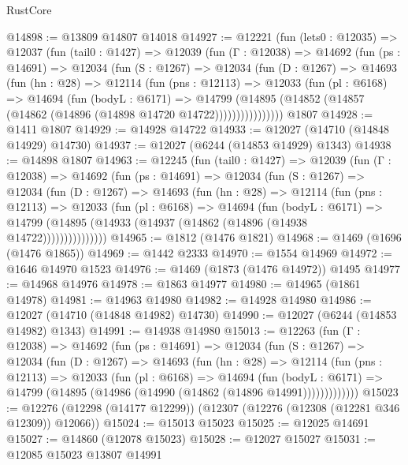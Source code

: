 \begin{lexlean}{RustCore}
\begin{coremodule}
@14898 := @13809 @14807 @14018
@14927 := @12221
    (fun (lets0 : @12035) =>
    @12037
      (fun (tail0 : @1427) =>
      @12039
        (fun (Γ : @12038) =>
        @14692
          (fun (ps : @14691) =>
          @12034
            (fun (S : @1267) =>
            @12034
              (fun (D : @1267) =>
              @14693
                (fun (hn : @28) =>
                @12114
                  (fun (pns : @12113) =>
                  @12033
                    (fun (pl : @6168) =>
                    @14694
                      (fun (bodyL : @6171) =>
                      @14799
                        (@14895
                          (@14852 (@14857 (@14862 (@14896 (@14898 @14720 @14722))))))))))))))))
    @1807
@14928 := @1411 @1807
@14929 := @14928 @14722
@14933 := @12027 (@14710 (@14848 @14929) @14730)
@14937 := @12027 (@6244 (@14853 @14929) @1343)
@14938 := @14898 @1807
@14963 := @12245
    (fun (tail0 : @1427) =>
    @12039
      (fun (Γ : @12038) =>
      @14692
        (fun (ps : @14691) =>
        @12034
          (fun (S : @1267) =>
          @12034
            (fun (D : @1267) =>
            @14693
              (fun (hn : @28) =>
              @12114
                (fun (pns : @12113) =>
                @12033
                  (fun (pl : @6168) =>
                  @14694
                    (fun (bodyL : @6171) =>
                    @14799 (@14895 (@14933 (@14937 (@14862 (@14896 (@14938 @14722)))))))))))))))
@14965 := @1812 (@1476 @1821)
@14968 := @1469 (@1696 (@1476 @1865))
@14969 := @1442 @2333
@14970 := @1554 @14969
@14972 := @1646 @14970 @1523
@14976 := @1469 (@1873 (@1476 @14972)) @1495
@14977 := @14968 @14976
@14978 := @1863 @14977
@14980 := @14965 (@1861 @14978)
@14981 := @14963 @14980
@14982 := @14928 @14980
@14986 := @12027 (@14710 (@14848 @14982) @14730)
@14990 := @12027 (@6244 (@14853 @14982) @1343)
@14991 := @14938 @14980
@15013 := @12263
    (fun (Γ : @12038) =>
    @14692
      (fun (ps : @14691) =>
      @12034
        (fun (S : @1267) =>
        @12034
          (fun (D : @1267) =>
          @14693
            (fun (hn : @28) =>
            @12114
              (fun (pns : @12113) =>
              @12033
                (fun (pl : @6168) =>
                @14694
                  (fun (bodyL : @6171) =>
                  @14799 (@14895 (@14986 (@14990 (@14862 (@14896 @14991)))))))))))))
@15023 := @12276 (@12298 (@14177 @12299)) (@12307 (@12276 (@12308 (@12281 @346 @12309)) @12066))
@15024 := @15013 @15023
@15025 := @12025 @14691
@15027 := @14860 (@12078 @15023)
@15028 := @12027 @15027
@15031 := @12085 @15023 @13807 @14991

\end{coremodule}
\end{lexlean}
